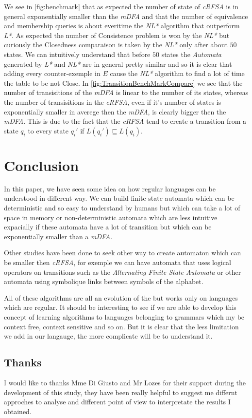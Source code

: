 We see in \cref{fig:benchmark} that as expected the number of state of \textit{cRFSA} is in general exponentially smaller than the \textit{mDFA} and that the number of equivalence and membership queries is about everitime the \textit{NL*} algorithm that outperform \textit{L*}. As expected the number of Consistence problem is won by the \textit{NL*} but curiously the Closedness comparaison is taken by the \textit{NL*} only after about $50$ states. We can intuitively understand that before $50$ states the \textit{Automata} generated by \textit{L*} and \textit{NL*} are in general pretty similar and so it is clear that adding every counter-exemple in $E$ cause the \textit{NL*} algorithm to find a lot of time the table to be not Close. In \cref{fig:TransitionBenchMarkCompare} we see that the number of transisitions of the \textit{mDFA} is linear to the number of its states, whereas the number of transisitions in the \textit{cRFSA}, even if it's number of states is exponentially smaller in averege then the \textit{mDFA}, is clearly bigger then the \textit{mDFA}. This is due to the fact that the \textit{cRFSA} tend to create a transition from a state $q_i$ to every state $q_i'$ if $L(q_i') \sqsubseteq L(q_i)$.

\section{Conclusion}

In this paper, we have seen some idea on how regular languages can be understood in different way. We can build finite state automata which can be deterministic and so easy to understand by humans but which can take a lot of space in memory or non-deterministic automata which are less intuitive expacially if these automata have a lot of transition but which can be exponentially smaller than a \textit{mDFA}.

Other studies have been done to seek other way to create automaton which can be smaller then \textit{cRFSA}, for exemple we can have automata that uses logical operators on transitions such as the \textit{Alternating Finite State Automata} or other automata using symbolique links between symbols of the alphabet.

All of these algorithms are all an evolution of the \cite{LPaper} but works only on languages which are regular. It should be interesting to see if we are able to develop this concept of learning algorithms to languages belonging to grammars which my be context free, context sensitive and so on. But it is clear that the less limitation we add in our langauge, the more complicate will be to understand it.

\subsection{Thanks}
I would like to thanks Mme Di Giusto and Mr Lozes for their support during the development of this study, they have been really helpful to suggest me differnt approches to analyse and different point of view to interpretate the results I obtained.